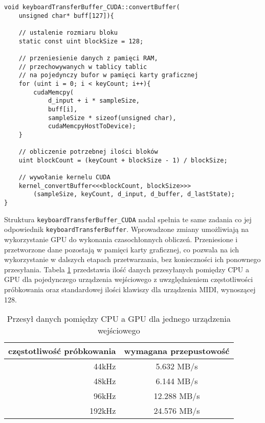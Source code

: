 \begin{lstlisting}
void keyboardTransferBuffer_CUDA::convertBuffer(
    unsigned char* buff[127]){

    // ustalenie rozmiaru bloku
    static const uint blockSize = 128;

    // przeniesienie danych z pamięci RAM,
    // przechowywanych w tablicy tablic
    // na pojedynczy bufor w pamięci karty graficznej
    for (uint i = 0; i < keyCount; i++){
        cudaMemcpy(
            d_input + i * sampleSize,
            buff[i],
            sampleSize * sizeof(unsigned char),
            cudaMemcpyHostToDevice);
    }

    // obliczenie potrzebnej ilości bloków
    uint blockCount = (keyCount + blockSize - 1) / blockSize;

    // wywołanie kernelu CUDA
    kernel_convertBuffer<<<blockCount, blockSize>>>
        (sampleSize, keyCount, d_input, d_buffer, d_lastState);
}
\end{lstlisting}

Struktura \texttt{keyboardTransferBuffer\_CUDA} nadal spełnia te same zadania co jej odpowiednik \texttt{keyboardTransferBuffer}. Wprowadzone zmiany umożliwiają na wykorzystanie GPU do wykonania czasochłonnych obliczeń. Przeniesione i przetworzone dane pozostają w pamięci karty graficznej, co pozwala na ich wykorzystanie w dalszych etapach przetwarzania, bez konieczności ich ponownego przesyłania. Tabela \ref{tab:Przesył danych pomiędzy CPU a GPU dla jednego urządzenia wejściowego} przedstawia ilość danych przesyłanych pomiędzy CPU a GPU dla pojedynczego urządzenia wejściowego z uwzględnieniem częstotliwości próbkowania oraz standardowej ilości klawiszy dla urządzenia MIDI, wynoszącej 128.

\begin{table}[H]
    \begin{center}
        \caption{Przesył danych pomiędzy CPU a GPU dla jednego urządzenia wejściowego}
        \label{tab:Przesył danych pomiędzy CPU a GPU dla jednego urządzenia wejściowego}
        \begin{tabular}{r|c|}
            częstotliwość próbkowania  &   wymagana przepustowość \\
            \hline
            44kHz                      &   5.632 MB/s   \\
            48kHz                      &   6.144 MB/s   \\
            96kHz                      &   12.288 MB/s  \\
            192kHz                     &   24.576 MB/s  \\
        \end{tabular}
    \end{center}
\end{table}

